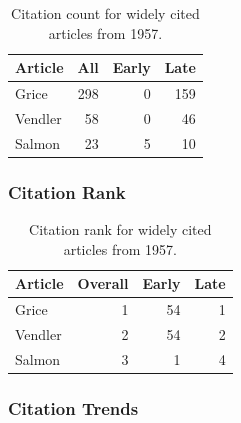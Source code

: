 \documentclass[
  10pt,
  letterpaper,
  DIV=11,
  numbers=noendperiod,
  twoside]{scrartcl}
\begin{document}
\begin{longtable}[]{@{}lrrr@{}}

\caption{\label{tbl-citation-count-1957}Citation count for widely cited
articles from 1957.}

\tabularnewline

\toprule\noalign{}
Article & All & Early & Late \\
\midrule\noalign{}
\endhead
\bottomrule\noalign{}
\endlastfoot
Grice & 298 & 0 & 159 \\
Vendler & 58 & 0 & 46 \\
Salmon & 23 & 5 & 10 \\

\end{longtable}

\subsubsection*{Citation Rank}\label{sec-rank-1957}

\begin{longtable}[]{@{}lrrr@{}}

\caption{\label{tbl-citation-rank-1957}Citation rank for widely cited
articles from 1957.}

\tabularnewline

\toprule\noalign{}
Article & Overall & Early & Late \\
\midrule\noalign{}
\endhead
\bottomrule\noalign{}
\endlastfoot
Grice & 1 & 54 & 1 \\
Vendler & 2 & 54 & 2 \\
Salmon & 3 & 1 & 4 \\

\end{longtable}

\subsubsection*{Citation Trends}\label{sec-trends-1957}
\end{document}
